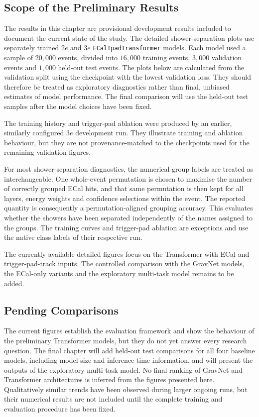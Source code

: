 \subsection{Scope of the Preliminary Results}
\label{sec:results_model_presentation}

The results in this chapter are provisional development results included to
document the current state of the study. The detailed shower-separation plots
use separately trained \(2e\) and \(3e\) \texttt{ECalTpadTransformer} models.
Each model used a sample of \(20{,}000\) events, divided into \(16{,}000\)
training events, \(3{,}000\) validation events and \(1{,}000\) held-out test
events. The plots below are calculated from the validation split using the
checkpoint with the lowest validation loss. They should therefore be treated
as exploratory diagnostics rather than final, unbiased estimates of model
performance. The final comparison will use the held-out test samples after the
model choices have been fixed.

The training history and trigger-pad ablation were produced by an earlier,
similarly configured \(3e\) development run. They illustrate training and
ablation behaviour, but they are not provenance-matched to the checkpoints
used for the remaining validation figures.

For most shower-separation diagnostics, the numerical group labels are treated
as interchangeable. One whole-event permutation is chosen to maximise the
number of correctly grouped ECal hits, and that same permutation is then kept
for all layers, energy weights and confidence selections within the event.
The reported quantity is consequently a permutation-aligned grouping accuracy.
This evaluates whether the showers have been separated independently of the
names assigned to the groups. The training curves and trigger-pad ablation are
exceptions and use the native class labels of their respective run.

The currently available detailed figures focus on the Transformer with ECal
and trigger-pad-track inputs. The controlled comparison with the GravNet
models, the ECal-only variants and the exploratory multi-task model remains to
be added.




\clearpage
\subsection{Pending Comparisons}

The current figures establish the evaluation framework and show the behaviour
of the preliminary Transformer models, but they do not yet answer every
research question. The final chapter will add held-out test comparisons for
all four baseline models, including model size and inference-time information,
and will present the outputs of the exploratory multi-task model. No final
ranking of GravNet and Transformer architectures is inferred from the figures
presented here. Qualitatively similar trends have been observed during larger
ongoing runs, but their numerical results are not included until the complete
training and evaluation procedure has been fixed.
